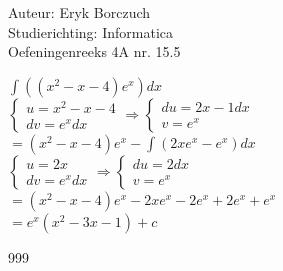 \documentclass[a4paper]{article}
\begin{document}
  
\noindent \large Auteur: Eryk Borczuch \\
\noindent \large Studierichting: Informatica\\
\noindent \large Oefeningenreeks 4A nr. 15.5\\

\medskip

\normalsize


$\int((x^2-x-4)e^x)dx$\\

$\left\{
   \begin{array}{l}
       u = x^2-x-4\\
       dv = e^x dx
   \end{array}
\right.
\Rightarrow
\left\{
   \begin{array}{l}
       du = 2x-1 dx \\
       v =e^x
   \end{array}
\right.$\\


$= (x^2-x-4)e^x-\int(2xe^x-e^x)dx$\\

$\left\{
   \begin{array}{l}
       u = 2x\\
       dv = e^x dx
   \end{array}
\right.
\Rightarrow
\left\{
   \begin{array}{l}
       du = 2 dx \\
       v =e^x
   \end{array}
\right.$\\

$= (x^2-x-4)e^x-2xe^x-2e^x+2e^x+e^x$\\

$=e^x(x^2-3x-1)+c$\\



\begin{thebibliography}{999}
\end{thebibliography}
\end{document}
